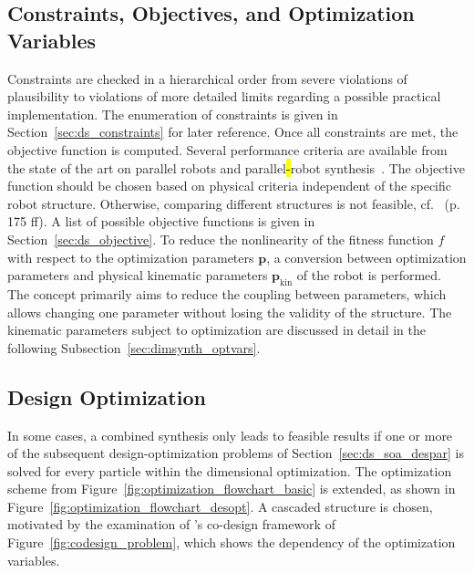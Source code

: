 \subsection{Constraints, Objectives, and Optimization Variables}
\label{sec:ds_constraints_objectives_variables}
%
%
%
Constraints are checked in a hierarchical order from severe violations of plausibility to violations of more detailed limits regarding a possible practical implementation.
The enumeration of constraints is {given in Section~\ref{sec:ds_constraints} for later reference.}
%
%
%
%
Once all constraints are met, the objective function is computed.
Several performance criteria are available from the state of the art on parallel robots \cite{Merlet2006} and parallel\hl{-}robot synthesis~\cite{Krefft2006}. %
The objective function should be chosen based on physical criteria independent of the specific robot structure.
Otherwise, comparing different structures is not feasible, cf.~\cite{Krefft2006} (p. 175 ff).
A list of possible objective functions is given in Section~\ref{sec:ds_objective}.
%
%
%
%
To reduce the nonlinearity of the fitness function $f$ with respect to the optimization parameters $\bm{p}$, a conversion between optimization parameters and physical kinematic parameters $\bm{p}_\mathrm{kin}$ of the robot is performed.
The concept primarily aims to reduce the coupling between parameters, which allows changing one parameter without losing the validity of the structure.
The kinematic parameters subject to optimization {are discussed in detail in the following Subsection~\ref{sec:dimsynth_optvars}.}






\subsection{Design Optimization}
\label{sec:dimsynth_desopt}

In some cases, a combined synthesis only leads to feasible results if one or more of the subsequent design-optimization problems of Section~\ref{sec:ds_soa_despar} {is} solved for every particle within the dimensional optimization.
The optimization scheme from Figure~\ref{fig:optimization_flowchart_basic} is extended, as shown in Figure~\ref{fig:optimization_flowchart_desopt}.
A cascaded structure is chosen, motivated by the examination of 's co-design framework of Figure~\ref{fig:codesign_problem}, which shows the dependency of the \linebreak optimization variables.

